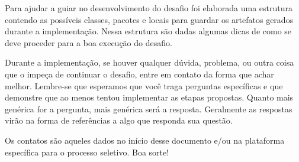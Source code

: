 \documentclass{article}
\begin{document}
Para ajudar a guiar no desenvolvimento do desafio foi elaborada uma estrutura
contendo as possíveis classes, pacotes e locais para guardar os artefatos
gerados durante a implementação. Nessa estrutura são dadas algumas dicas de
como se deve proceder para a boa execução do desafio.

Durante a implementação, se houver qualquer dúvida, problema, ou outra coisa
que o impeça de continuar o desafio, entre em contato da forma que achar
melhor. Lembre-se que esperamos que você traga perguntas específicas e que
demonstre que ao menos tentou implementar as etapas propostas. Quanto mais
genérica for a pergunta, mais genérica será a resposta. Geralmente as respostas
virão na forma de referências a algo que responda sua questão.

Os contatos são aqueles dados no início desse documento e/ou na plataforma
específica para o processo seletivo. Boa sorte!



\end{document}
